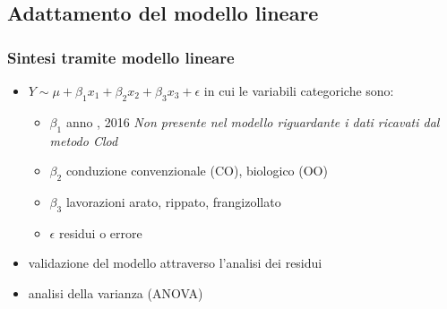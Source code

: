 \documentclass[10pt]{beamer}
\begin{document}
\subsection{Adattamento del modello lineare}
\begin{frame}
  \frametitle{Sintesi tramite modello lineare}
  \begin{itemize}
    \item 
    \vspace{0.25cm}
    $Y \sim \mu + \beta_1x_1 + \beta_2x_2 + \beta_3x_3 + \epsilon$
    \vspace{0.25cm}
    in cui le variabili categoriche sono:
    \begin{itemize}
      \item $\beta_1$ anno , 2016 \emph{Non
        presente nel modello riguardante i dati ricavati dal metodo \emph{Clod}}
      \item $\beta_2$ conduzione \newline convenzionale
      (CO), biologico (OO) \item $\beta_3$
      lavorazioni \newline arato, rippato, frangizollato
      \item$\epsilon$ residui o errore
    \end{itemize}
    \item validazione del modello attraverso l'analisi
    dei residui 
    \item analisi della varianza (ANOVA)
  \end{itemize}
\end{frame}
\end{document}
